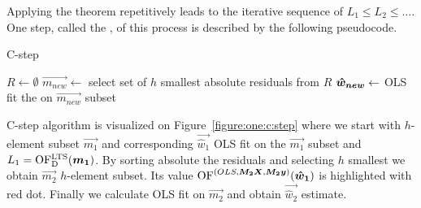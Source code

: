Applying the theorem repetitively leads to the iterative sequence of
$L_{1} \leq L_{2} \leq \ldots$. One step, called the , of this process is described by the following pseudocode.

\begin{algorithm}[H]
    \label{alg:Cstep}
    \caption{C-step}
    $R \gets \emptyset$\;
    $\vec{m_{new}} \gets $ select set of $h$ smallest absolute residuals from $R$\;
    $\boldsymbol{\hat{w}_{new}} \gets$ OLS fit the on $\vec{m_{new}}$ subset\;
    \;
\end{algorithm}

C-step algorithm is visualized on Figure~\ref{figure:one:c:step} where we start with $h$-element subset $\vec{m_1}$ and corresponding $\vec{\hat{w}_1}$ OLS fit on the $\vec{m_1}$ subset and $L_1 = \operatorname{OF^{LTS}_D}(\boldsymbol{m_1})$. By sorting absolute the residuals and selecting $h$ smallest we obtain $\vec{m_2}$ $h$-element subset. Its value $\operatorname{OF}^{(OLS,\boldsymbol{M_2}\boldsymbol{X},  \boldsymbol{M_2}\boldsymbol{y})} (\boldsymbol{\hat{w}_1})$ is highlighted with red dot. Finally we calculate OLS fit on $\vec{m_2}$ and obtain $\vec{\hat{w}_2}$ estimate. 


